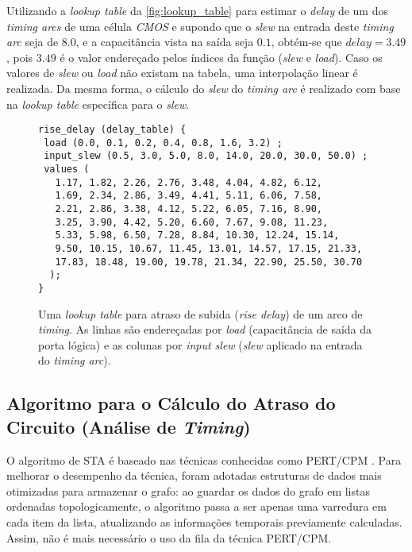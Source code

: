 \documentclass[
	12pt,				%
	openright,			%
	twoside,			%
	a4paper,			%
	english,			%
	french,				%
	spanish,			%
	brazil,				%
	]{abntex2}
\begin{document}
Utilizando a \textit{lookup table} da \autoref{fig:lookup_table} para estimar o \textit{delay} de um dos \textit{timing arcs} de uma célula \textit{CMOS} e supondo que o \textit{slew} na entrada deste \textit{timing arc} seja de $8.0$, e a capacitância vista na saída seja $0.1$, obtém-se que $delay = 3.49$, pois $3.49$ é o valor endereçado pelos índices da função (\textit{slew} e \textit{load}). Caso os valores de \textit{slew} ou \textit{load} não existam na tabela, uma interpolação linear é realizada. Da mesma forma, o cálculo do \textit{slew} do \textit{timing arc} é realizado com base na \textit{lookup table} específica para o \textit{slew}.

\begin{figure}[ht]
\lstset{basicstyle=\footnotesize}
\caption{\label{fig:lookup_table}Uma \textit{lookup table} para atraso de subida (\textit{rise delay}) de um arco de \textit{timing}. As linhas são endereçadas por \textit{load} (capacitância de saída da porta lógica) e as colunas por \textit{input slew} (\textit{slew} aplicado na entrada do \textit{timing arc}).}
\begin{lstlisting}[frame=single]
rise_delay (delay_table) {
 load (0.0, 0.1, 0.2, 0.4, 0.8, 1.6, 3.2) ;
 input_slew (0.5, 3.0, 5.0, 8.0, 14.0, 20.0, 30.0, 50.0) ;
 values (
   1.17, 1.82, 2.26, 2.76, 3.48, 4.04, 4.82, 6.12,
   1.69, 2.34, 2.86, 3.49, 4.41, 5.11, 6.06, 7.58,
   2.21, 2.86, 3.38, 4.12, 5.22, 6.05, 7.16, 8.90,
   3.25, 3.90, 4.42, 5.20, 6.60, 7.67, 9.08, 11.23,
   5.33, 5.98, 6.50, 7.28, 8.84, 10.30, 12.24, 15.14,
   9.50, 10.15, 10.67, 11.45, 13.01, 14.57, 17.15, 21.33,
   17.83, 18.48, 19.00, 19.78, 21.34, 22.90, 25.50, 30.70
  );
}
\end{lstlisting}

\end{figure}

\subsection{Algoritmo para o Cálculo do Atraso do Circuito (Análise de \textit{Timing})}

O algoritmo de STA é baseado nas técnicas conhecidas como PERT/CPM \cite{BhaskerChadha09}. Para melhorar o desempenho da técnica, foram adotadas estruturas de dados mais otimizadas para armazenar o grafo: ao guardar os dados do grafo em listas ordenadas topologicamente, o algoritmo passa a ser apenas uma varredura em cada item da lista, atualizando as informações temporais previamente calculadas. Assim, não é mais necessário o uso da fila da técnica PERT/CPM.
\end{document}

